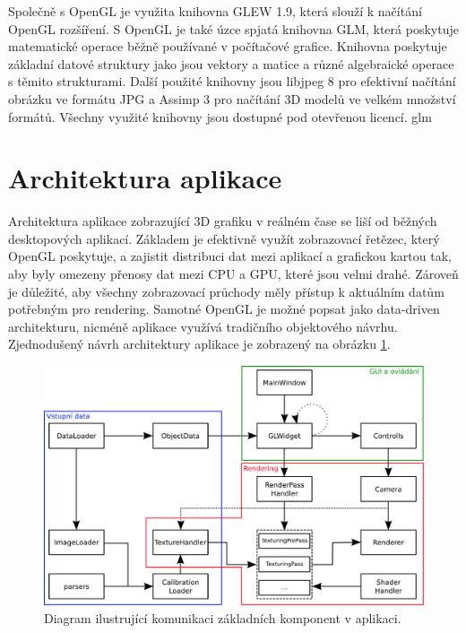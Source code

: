 \documentclass[11pt,twoside,a4paper]{book}
\begin{document}
Společně s OpenGL je využita knihovna GLEW 1.9, která slouží k načítání OpenGL rozšíření. S OpenGL je také úzce spjatá knihovna GLM, která poskytuje matematické operace běžně používané v počítačové grafice. Knihovna poskytuje základní datové struktury jako jsou vektory a matice a různé algebraické operace s těmito strukturami. Další použité knihovny jsou libjpeg 8 pro efektivní načítání obrázku ve formátu JPG a Assimp 3 pro načítání 3D modelů ve velkém množství formátů. Všechny využité knihovny jsou dostupné pod otevřenou licencí.
glm

\section{Architektura aplikace}

Architektura aplikace zobrazující 3D grafiku v reálném čase se liší od běžných desktopových aplikací. Základem je efektivně využít zobrazovací řetězec, který OpenGL poskytuje, a zajistit distribuci dat mezi aplikací a grafickou kartou tak, aby byly omezeny přenosy dat mezi CPU a GPU, které jsou velmi drahé. Zároveň je důležité, aby všechny zobrazovací průchody měly přístup k aktuálním datům potřebným pro rendering. Samotné OpenGL je možné popsat jako data-driven architekturu, nicméně aplikace využívá tradičního objektového návrhu.  Zjednodušený návrh architektury aplikace je zobrazený na obrázku \ref{fig:architecture}.

\begin{figure}[ht]
\begin{center}
\includegraphics[width=\textwidth]{figures/architecture2}
\caption{Diagram ilustrující komunikaci základních komponent v aplikaci.}
\label{fig:architecture}
\end{center}
\end{figure}
\end{document}
